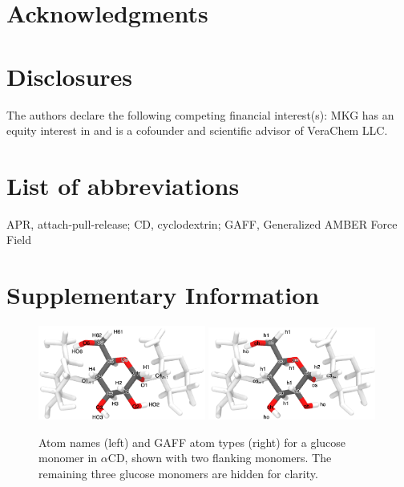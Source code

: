\documentclass[9pt,lineno]{elife}
\begin{document}
\section{Acknowledgments}
\section{Disclosures}
The authors declare the following competing financial interest(s): MKG has an equity interest in and is a cofounder and scientific advisor of VeraChem LLC.

\section{List of abbreviations}
APR, attach-pull-release; CD, cyclodextrin; GAFF, Generalized AMBER Force Field




\appendix
\section{Supplementary Information}
\begin{figure}[tb]
\centering
\includegraphics[width=0.49\textwidth]{images/atom-names-trimer.png}
\includegraphics[width=0.49\textwidth]{images/gaff-atom-types.png}
\caption{Atom names (left) and GAFF atom types (right) for a glucose monomer in $\alpha$CD, shown with two flanking monomers. The remaining three glucose monomers are hidden for clarity.}
\label{fig:atom-names}
\end{figure}
\end{document}
